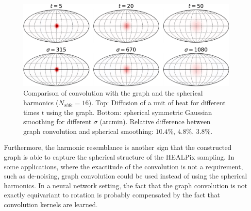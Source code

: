 \documentclass[final,twocolumn,3p,times,sort&compress]{elsarticle}
\newcommand{\1}{\b{1}}              %
\newcommand{\0}{\b{0}}              %
\begin{document}
\begin{figure}[ht!]
  \centering
  \includegraphics[width=\linewidth]{gaussian_filters_sphere}
  \caption{Comparison of convolution with the graph and the spherical harmonics ($N_{side} = 16$).
  Top: Diffusion of a unit of heat for different times $t$ using the graph.
  Bottom: spherical symmetric Gaussian smoothing for different $\sigma$ (arcmin).
  Relative difference between graph convolution and spherical smoothing: $10.4$\%, $4.8$\%, $3.8$\%.
}
  \label{fig:gaussian_filters_comparizon}
\end{figure}

Furthermore, the harmonic resemblance is another sign that the constructed graph is able to capture the spherical structure of the HEALPix sampling.
In some applications, where the exactitude of the convolution is not a requirement, such as de-noising, graph convolution could be used instead of using the spherical harmonics.
In a neural network setting, the fact that the graph convolution is not exactly equivariant to rotation is probably compensated by the fact that convolution kernels are learned.
\end{document}
